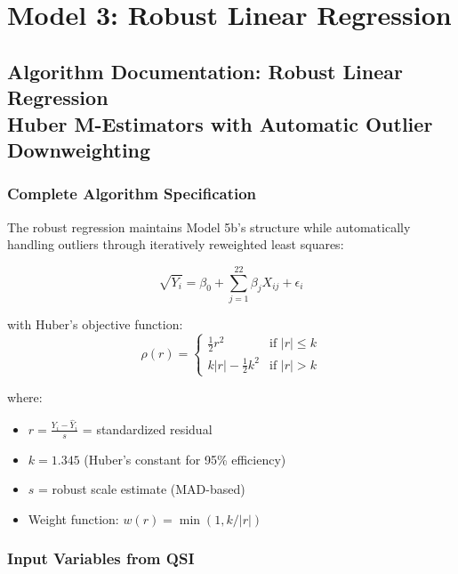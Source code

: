 \chapter{Model 3: Robust Linear Regression}\newpage

\section{Algorithm Documentation: Robust Linear Regression\\Huber M-Estimators with Automatic Outlier Downweighting}

\subsection{Complete Algorithm Specification}

The robust regression maintains Model 5b's structure while automatically handling outliers through iteratively reweighted least squares:

\begin{equation}
\sqrt{Y_i} = \beta_0 + \sum_{j=1}^{22} \beta_j X_{ij} + \epsilon_i
\end{equation}

with Huber's objective function:
\begin{equation}
\rho(r) = \begin{cases}
\frac{1}{2}r^2 & \text{if } |r| \leq k \\
k|r| - \frac{1}{2}k^2 & \text{if } |r| > k
\end{cases}
\end{equation}

where:
\begin{itemize}
    \item $r = \frac{Y_i - \hat{Y}_i}{s}$ = standardized residual
    \item $k = 1.345$ (Huber's constant for 95\% efficiency)
    \item $s$ = robust scale estimate (MAD-based)
    \item Weight function: $w(r) = \min(1, k/|r|)$
\end{itemize}

\subsection{Input Variables from QSI}

